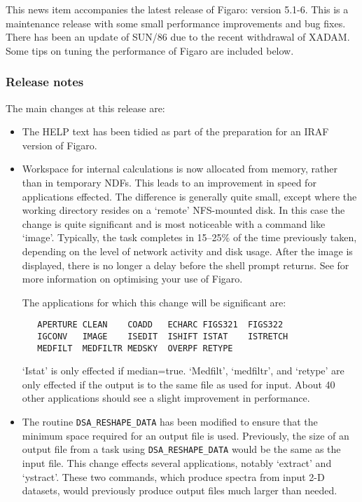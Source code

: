  This news item accompanies the latest release of Figaro: version
 5.1-6.  This is a maintenance release with some small performance
 improvements and bug fixes.  There has been an update of SUN/86
 due to the recent withdrawal of XADAM.  Some tips on tuning the
 performance of Figaro are included below.

\subsubsection{\label{news516_release_notes}Release notes}

   The main changes at this release are:

\begin{itemize}

\item The HELP text has been tidied as part of the preparation for
      an IRAF version of Figaro.

\item Workspace for internal calculations is now allocated from memory,
      rather than in temporary NDFs.  This leads to an improvement in
      speed for applications effected.  The difference is generally
      quite small, except where the working directory resides on a
      `remote' NFS-mounted disk.  In this case the change is quite
      significant and is most noticeable with a command like `image'.
      Typically, the task completes in 15--25\% of the time previously
      taken, depending on the level of network activity and disk usage.
      After the image is displayed, there is no longer a delay before
      the shell prompt returns.  See 
      {}
      for more information on optimising your use of Figaro.

      The applications for which this change will be significant are:

\begin{verbatim}
   APERTURE CLEAN    COADD   ECHARC FIGS321  FIGS322
   IGCONV   IMAGE    ISEDIT  ISHIFT ISTAT    ISTRETCH
   MEDFILT  MEDFILTR MEDSKY  OVERPF RETYPE
\end{verbatim}

      `Istat' is only effected if median=true.  `Medfilt', `medfiltr', and
      `retype' are only effected if the output is to the same file as
      used for input.  About 40 other applications should see a slight
      improvement in performance.

\item The routine \verb+DSA_RESHAPE_DATA+ has been modified to ensure that
      the minimum space required for an output file is used.  Previously,
      the size of an output file from a task using \verb+DSA_RESHAPE_DATA+
      would be the same as the input file.  This change effects several
      applications, notably `extract' and `ystract'\@.  These two commands,
      which produce spectra from input 2-D datasets, would previously
      produce output files much larger than needed.


\end{itemize}
